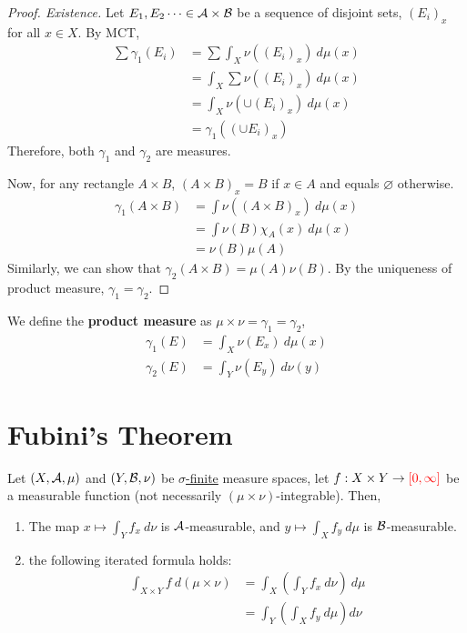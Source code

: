 \documentclass[11pt]{article}
\newcommand{\dmu}[0]{\ d\mu}
\begin{document}
\begin{theorem}
\begin{proof}[Proof. Existence]
			Let $E_1, E_2 \dots \in \mathcal{{A}} \times \mathcal{{B}}$ be a sequence of disjoint sets, $(E_i)_x$ for all $x \in X$.
			By MCT,
			\begin{align}
				\sum \gamma_1(E_i) &= \sum \int_X \nu((E_i)_x)\dmu(x) \\
				&= \int_X \sum \nu((E_i)_x)\dmu(x) \\
				&= \int_X \nu (\cup (E_i)_x)\dmu(x) \\
				&= \gamma_1((\cup E_i)_x)
			\end{align}
			Therefore, both $\gamma_1$ and $\gamma_2$ are measures.
			
			Now, for any rectangle $A \times B$, $(A \times B)_x = B$ if $x \in A$ and equals $\varnothing$ otherwise.
			\begin{align}
				\gamma_1(A \times B) &= \int \nu((A \times B)_x)\dmu(x) \\
				&= \int \nu(B) \chi_A(x)\dmu(x) \\
				&= \nu(B) \mu(A)
			\end{align}
			Similarly, we can show that $\gamma_2(A\times B) = \mu(A) \nu(B)$.
			By the uniqueness of product measure, $\gamma_1 = \gamma_2$.
		\end{proof}
	\end{theorem}
	\begin{definition}
		We define the \textbf{product measure} as $\mu \times \nu = \gamma_1 = \gamma_2$,
		\begin{align}
			\gamma_1(E) &= \int_X \nu(E_x)\dmu(x) \\
			\gamma_2(E) &= \int_Y \nu(E_y)\ d\nu(y)
		\end{align}
	\end{definition}
	
	\section{Fubini's Theorem}
	\begin{theorem}
		Let $(X, \mathcal{{A}}, \mu)$ and $(Y, \mathcal{{B}}, \nu)$ be \ul{$\sigma$-finite} measure spaces, let $f: X \times Y \to \textcolor{red}{[0, \infty]}$ be a measurable function (not necessarily $(\mu \times \nu)$-integrable). Then,
		\begin{enumerate}
			\item The map $x \mapsto \int_Y f_x\ d\nu$ is $\mathcal{{A}}$-measurable, and $y \mapsto \int_X f_y\ d\mu$ is $\mathcal{{B}}$-measurable.
			\item the following iterated formula holds:
			\begin{align}
				\int_{X \times Y} f\ d(\mu \times \nu)
				&= \int_X \left(\int_Y f_x\ d\nu \right)\dmu \\
				&= \int_Y \left(\int_X f_y\dmu \right)d\nu
			\end{align}
		\end{enumerate}
	\end{theorem}
	
\end{document}
